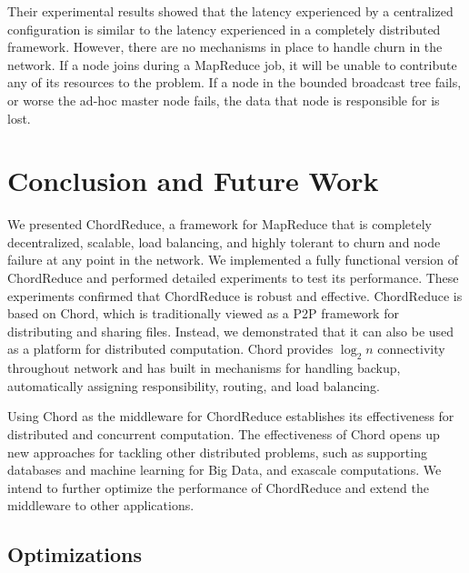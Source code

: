 \documentclass[10pt, conference, compsocconf]{IEEEtran}
\begin{document}
Their experimental results showed that the latency experienced by a centralized configuration is similar to the latency experienced in a completely distributed framework.  However, there are no mechanisms in place to handle churn in the network.  If a node joins during a MapReduce job, it will be unable to contribute any of its resources to the problem. If a node in the bounded broadcast tree fails, or worse the ad-hoc master node fails, the data that node is responsible for is lost. 

\section{Conclusion and Future Work}
We presented ChordReduce, a framework for MapReduce that is completely decentralized, scalable, load balancing, and highly tolerant to churn and node failure at any point in the network. We implemented a fully functional version of ChordReduce and performed detailed experiments to test its performance. These experiments confirmed that ChordReduce is robust and effective. ChordReduce is based on Chord, which is traditionally viewed as a P2P framework for distributing and sharing files.  Instead, we demonstrated that it can also be used as a platform for distributed computation.  Chord provides $\log_{2} n$ connectivity throughout network and has built in mechanisms for handling backup, automatically assigning responsibility, routing, and load balancing. 



Using Chord as the middleware for ChordReduce establishes its effectiveness for distributed and concurrent computation.
The effectiveness of Chord opens up new approaches for tackling other distributed problems, such as supporting databases and machine learning for Big Data, and exascale computations. We intend to further optimize the performance of ChordReduce and extend the middleware to other applications.
\subsection{Optimizations}



\end{document}
